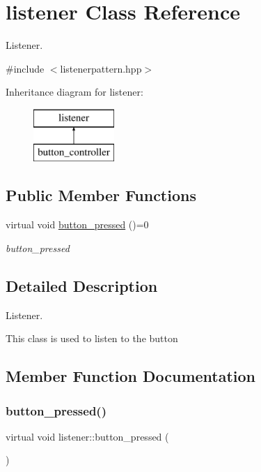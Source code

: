 \hypertarget{classlistener}{}\section{listener Class Reference}
\label{classlistener}


Listener.  




{\ttfamily \#include $<$listenerpattern.\+hpp$>$}

Inheritance diagram for listener\+:\begin{figure}[H]
\begin{center}
\leavevmode
\includegraphics[height=2.000000cm]{classlistener}
\end{center}
\end{figure}
\subsection*{Public Member Functions}
\begin{DoxyCompactItemize}
\item 
virtual void \hyperlink{classlistener_a22d7490fe1dce838b165d912f8015f0a}{button\+\_\+pressed} ()=0
\begin{DoxyCompactList}\small\item\em button\+\_\+pressed \end{DoxyCompactList}\end{DoxyCompactItemize}


\subsection{Detailed Description}
Listener. 

This class is used to listen to the button 

\subsection{Member Function Documentation}
\hypertarget{classlistener_a22d7490fe1dce838b165d912f8015f0a}{}\label{classlistener_a22d7490fe1dce838b165d912f8015f0a} 
\subsubsection{\texorpdfstring{button\+\_\+pressed()}{button\_pressed()}}
{\footnotesize\ttfamily virtual void listener\+::button\+\_\+pressed (\begin{DoxyParamCaption}{ }\end{DoxyParamCaption})\hspace{0.3cm}{\ttfamily [pure virtual]}}



